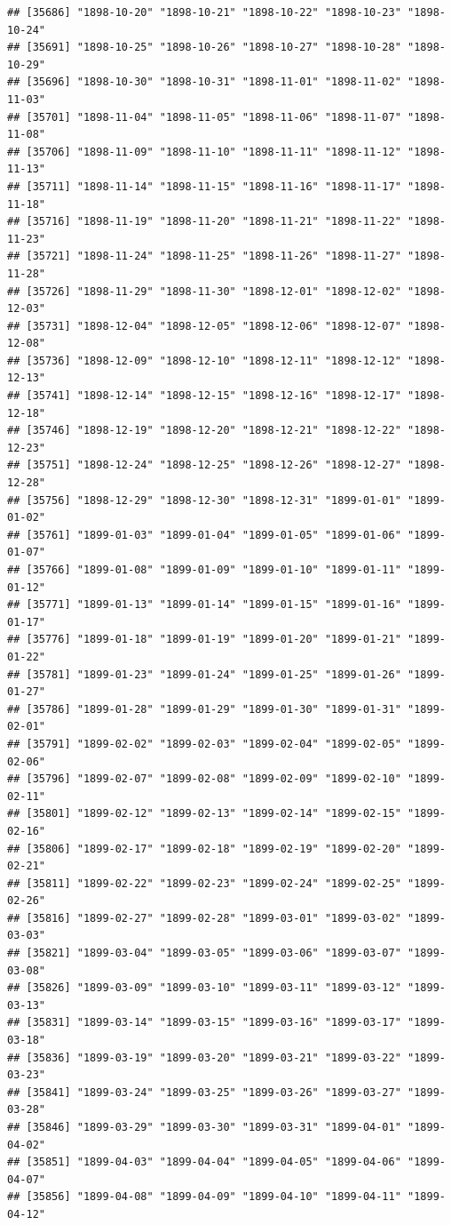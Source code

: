 \documentclass{article}\usepackage[]{graphicx}\usepackage[]{color}
\makeatletter
\newenvironment{kframe}{%
 \def\at@end@of@kframe{}%
 \ifinner\ifhmode%
  \def\at@end@of@kframe{\end{minipage}}%
  \begin{minipage}{\columnwidth}%
 \fi\fi%
 \def\FrameCommand##1{\hskip\@totalleftmargin \hskip-\fboxsep
 \colorbox{shadecolor}{##1}\hskip-\fboxsep
     \hskip-\linewidth \hskip-\@totalleftmargin \hskip\columnwidth}%
 \MakeFramed {\advance\hsize-\width
   \@totalleftmargin\z@ \linewidth\hsize
   \@setminipage}}%
 {\par\unskip\endMakeFramed%
 \at@end@of@kframe}
\newenvironment{knitrout}{}{} %
\makeatother
\begin{document}
\begin{description}
\begin{knitrout}
\begin{kframe}
\begin{verbatim}
## [35686] "1898-10-20" "1898-10-21" "1898-10-22" "1898-10-23" "1898-10-24"
## [35691] "1898-10-25" "1898-10-26" "1898-10-27" "1898-10-28" "1898-10-29"
## [35696] "1898-10-30" "1898-10-31" "1898-11-01" "1898-11-02" "1898-11-03"
## [35701] "1898-11-04" "1898-11-05" "1898-11-06" "1898-11-07" "1898-11-08"
## [35706] "1898-11-09" "1898-11-10" "1898-11-11" "1898-11-12" "1898-11-13"
## [35711] "1898-11-14" "1898-11-15" "1898-11-16" "1898-11-17" "1898-11-18"
## [35716] "1898-11-19" "1898-11-20" "1898-11-21" "1898-11-22" "1898-11-23"
## [35721] "1898-11-24" "1898-11-25" "1898-11-26" "1898-11-27" "1898-11-28"
## [35726] "1898-11-29" "1898-11-30" "1898-12-01" "1898-12-02" "1898-12-03"
## [35731] "1898-12-04" "1898-12-05" "1898-12-06" "1898-12-07" "1898-12-08"
## [35736] "1898-12-09" "1898-12-10" "1898-12-11" "1898-12-12" "1898-12-13"
## [35741] "1898-12-14" "1898-12-15" "1898-12-16" "1898-12-17" "1898-12-18"
## [35746] "1898-12-19" "1898-12-20" "1898-12-21" "1898-12-22" "1898-12-23"
## [35751] "1898-12-24" "1898-12-25" "1898-12-26" "1898-12-27" "1898-12-28"
## [35756] "1898-12-29" "1898-12-30" "1898-12-31" "1899-01-01" "1899-01-02"
## [35761] "1899-01-03" "1899-01-04" "1899-01-05" "1899-01-06" "1899-01-07"
## [35766] "1899-01-08" "1899-01-09" "1899-01-10" "1899-01-11" "1899-01-12"
## [35771] "1899-01-13" "1899-01-14" "1899-01-15" "1899-01-16" "1899-01-17"
## [35776] "1899-01-18" "1899-01-19" "1899-01-20" "1899-01-21" "1899-01-22"
## [35781] "1899-01-23" "1899-01-24" "1899-01-25" "1899-01-26" "1899-01-27"
## [35786] "1899-01-28" "1899-01-29" "1899-01-30" "1899-01-31" "1899-02-01"
## [35791] "1899-02-02" "1899-02-03" "1899-02-04" "1899-02-05" "1899-02-06"
## [35796] "1899-02-07" "1899-02-08" "1899-02-09" "1899-02-10" "1899-02-11"
## [35801] "1899-02-12" "1899-02-13" "1899-02-14" "1899-02-15" "1899-02-16"
## [35806] "1899-02-17" "1899-02-18" "1899-02-19" "1899-02-20" "1899-02-21"
## [35811] "1899-02-22" "1899-02-23" "1899-02-24" "1899-02-25" "1899-02-26"
## [35816] "1899-02-27" "1899-02-28" "1899-03-01" "1899-03-02" "1899-03-03"
## [35821] "1899-03-04" "1899-03-05" "1899-03-06" "1899-03-07" "1899-03-08"
## [35826] "1899-03-09" "1899-03-10" "1899-03-11" "1899-03-12" "1899-03-13"
## [35831] "1899-03-14" "1899-03-15" "1899-03-16" "1899-03-17" "1899-03-18"
## [35836] "1899-03-19" "1899-03-20" "1899-03-21" "1899-03-22" "1899-03-23"
## [35841] "1899-03-24" "1899-03-25" "1899-03-26" "1899-03-27" "1899-03-28"
## [35846] "1899-03-29" "1899-03-30" "1899-03-31" "1899-04-01" "1899-04-02"
## [35851] "1899-04-03" "1899-04-04" "1899-04-05" "1899-04-06" "1899-04-07"
## [35856] "1899-04-08" "1899-04-09" "1899-04-10" "1899-04-11" "1899-04-12"

\end{verbatim}
\end{kframe}
\end{knitrout}
\end{description}
\end{document}
